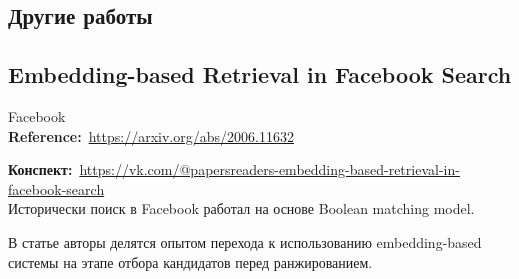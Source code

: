 \begin{bibunit}[plainnat]











\chapter{Другие работы}

\section*{Embedding-based Retrieval in Facebook Search}

Facebook \\

\textbf{Reference:}~\url{https://arxiv.org/abs/2006.11632}

\textbf{Конспект:}~\url{https://vk.com/@papersreaders-embedding-based-retrieval-in-facebook-search} \\

Исторически поиск в Facebook работал на основе Boolean matching model.

В статье авторы делятся опытом перехода к использованию embedding-based системы на этапе отбора кандидатов перед ранжированием. \\


\end{bibunit}
